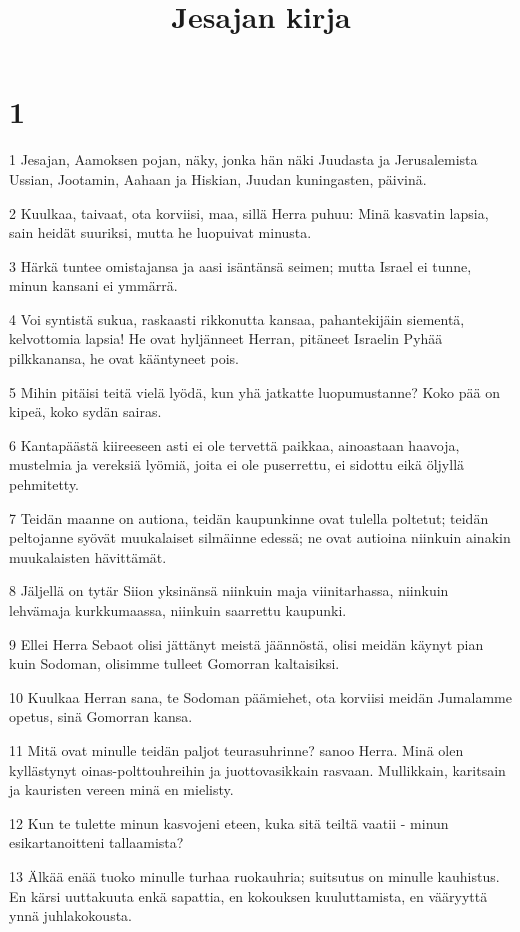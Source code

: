 

\title{Jesajan kirja}


\chapter{1}

\par 1 Jesajan, Aamoksen pojan, näky, jonka hän näki Juudasta ja Jerusalemista Ussian, Jootamin, Aahaan ja Hiskian, Juudan kuningasten, päivinä.
\par 2 Kuulkaa, taivaat, ota korviisi, maa, sillä Herra puhuu: Minä kasvatin lapsia, sain heidät suuriksi, mutta he luopuivat minusta.
\par 3 Härkä tuntee omistajansa ja aasi isäntänsä seimen; mutta Israel ei tunne, minun kansani ei ymmärrä.
\par 4 Voi syntistä sukua, raskaasti rikkonutta kansaa, pahantekijäin siementä, kelvottomia lapsia! He ovat hyljänneet Herran, pitäneet Israelin Pyhää pilkkanansa, he ovat kääntyneet pois.
\par 5 Mihin pitäisi teitä vielä lyödä, kun yhä jatkatte luopumustanne? Koko pää on kipeä, koko sydän sairas.
\par 6 Kantapäästä kiireeseen asti ei ole tervettä paikkaa, ainoastaan haavoja, mustelmia ja vereksiä lyömiä, joita ei ole puserrettu, ei sidottu eikä öljyllä pehmitetty.
\par 7 Teidän maanne on autiona, teidän kaupunkinne ovat tulella poltetut; teidän peltojanne syövät muukalaiset silmäinne edessä; ne ovat autioina niinkuin ainakin muukalaisten hävittämät.
\par 8 Jäljellä on tytär Siion yksinänsä niinkuin maja viinitarhassa, niinkuin lehvämaja kurkkumaassa, niinkuin saarrettu kaupunki.
\par 9 Ellei Herra Sebaot olisi jättänyt meistä jäännöstä, olisi meidän käynyt pian kuin Sodoman, olisimme tulleet Gomorran kaltaisiksi.
\par 10 Kuulkaa Herran sana, te Sodoman päämiehet, ota korviisi meidän Jumalamme opetus, sinä Gomorran kansa.
\par 11 Mitä ovat minulle teidän paljot teurasuhrinne? sanoo Herra. Minä olen kyllästynyt oinas-polttouhreihin ja juottovasikkain rasvaan. Mullikkain, karitsain ja kauristen vereen minä en mielisty.
\par 12 Kun te tulette minun kasvojeni eteen, kuka sitä teiltä vaatii - minun esikartanoitteni tallaamista?
\par 13 Älkää enää tuoko minulle turhaa ruokauhria; suitsutus on minulle kauhistus. En kärsi uuttakuuta enkä sapattia, en kokouksen kuuluttamista, en vääryyttä ynnä juhlakokousta.
